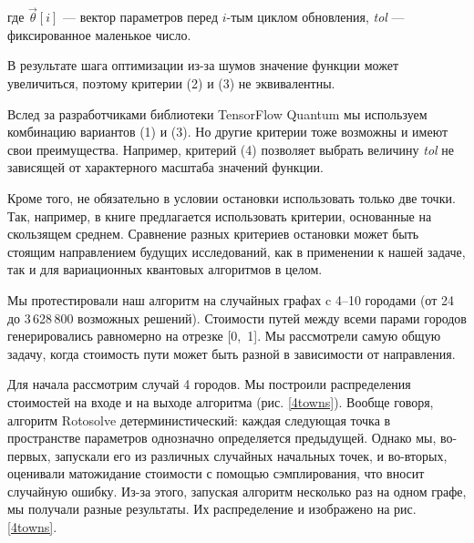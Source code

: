 где $\vec \theta [i]$ --- вектор параметров перед $i$-тым циклом обновления, \textsl{tol} --- фиксированное маленькое число. 

В результате шага оптимизации из-за шумов значение функции может увеличиться, поэтому критерии (2) и (3) не эквивалентны.

Вслед за разработчиками библиотеки TensorFlow Quantum \cite{tfq} мы используем комбинацию вариантов (1) и (3). Но другие критерии тоже возможны и имеют свои преимущества. Например, критерий (4) позволяет выбрать величину \textsl{tol} не зависящей от характерного масштаба значений функции. 

Кроме того, не обязательно в условии остановки использовать только две точки. Так, например, в книге \cite{cross-entropy} предлагается использовать критерии, основанные на скользящем среднем. Сравнение разных критериев остановки может быть стоящим направлением будущих исследований, как в применении к нашей задаче, так и для вариационных квантовых алгоритмов в целом.






Мы протестировали наш алгоритм на случайных графах c 4--10 городами (от 24 до 3\,628\,800 возможных решений). 
Стоимости путей между всеми парами городов генерировались равномерно на отрезке [0,~1]. 
Мы рассмотрели самую общую задачу, когда стоимость пути может быть разной в зависимости от направления.


Для начала рассмотрим случай 4 городов. Мы построили распределения стоимостей на входе и на выходе алгоритма (рис. \ref{4towns}). 
Вообще говоря, алгоритм Rotosolve детерминистический: каждая следующая точка в пространстве параметров однозначно определяется предыдущей. Однако мы, во-первых, запускали его из различных случайных начальных точек, и во-вторых, оценивали матожидание стоимости с помощью сэмплирования, что вносит случайную ошибку. Из-за этого, запуская алгоритм несколько раз на одном графе, мы получали разные результаты. Их распределение и изображено на рис. \ref{4towns}.

